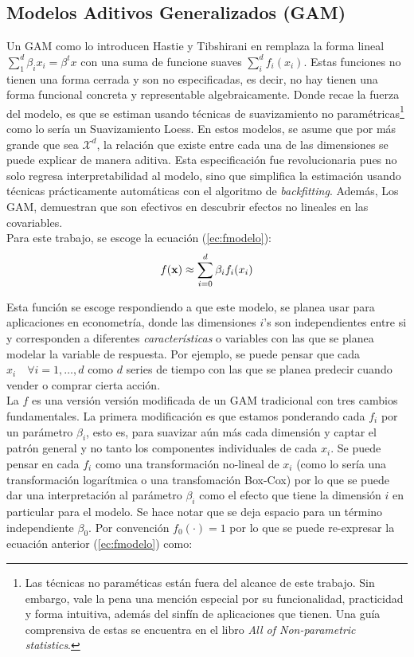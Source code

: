\documentclass[../Main/Main.tex]{subfiles}
\begin{document}
\subsection{Modelos Aditivos Generalizados (GAM)} \label{sec:GAM}
Un GAM como lo introducen Hastie y Tibshirani en \autocite{hastie1986generalized} remplaza la forma lineal $\sum_{1}^d\beta_ix_i = \beta^tx$ con una suma de funcione suaves $\sum_i^d f_i(x_i)$. Estas funciones no tienen una forma cerrada y son no especificadas, es decir, no hay tienen una forma funcional concreta y representable algebraicamente. Donde recae la fuerza del modelo, es que se estiman usando técnicas de suavizamiento no paramétricas\footnote{Las técnicas no paraméticas están fuera del alcance de este trabajo. Sin embargo, vale la pena una mención especial por su funcionalidad, practicidad y forma intuitiva, además del sinfín de aplicaciones que tienen. Una guía comprensiva de estas se encuentra en el libro \textit{All of Non-parametric statistics}\autocite{wasserman2007all}.} como lo sería un Suavizamiento Loess. En estos modelos, se asume que por más grande que sea $\mathcal{X}^d$, la relación que existe entre cada una de las dimensiones se puede explicar de manera aditiva. Esta especificación fue revolucionaria pues no solo regresa interpretabilidad al modelo, sino que simplifica la estimación usando técnicas prácticamente automáticas con el algoritmo de \textit{backfitting}. Además, Los GAM, demuestran que son efectivos en descubrir efectos no lineales en las covariables. \\

Para este trabajo, se escoge la ecuación (\ref{ec:fmodelo}): 
\begin{align*}
	f(\mathbf{x}) \approx \sum_{i=0}^d \beta_i f_i(x_i) 
\end{align*}

Esta función se escoge respondiendo a que este modelo, se planea usar para aplicaciones en econometría, donde las dimensiones $i$'s son independientes entre si y corresponden a diferentes \textit{características} o variables con las que se planea modelar la variable de respuesta. Por ejemplo, se puede pensar que cada $x_i \quad \forall i=1,\ldots,d$ como $d$ series de tiempo con las que se planea predecir cuando vender o comprar cierta acción.\\

La $f$ es una versión versión modificada de un GAM tradicional con tres cambios fundamentales. La primera modificación es que estamos ponderando cada $f_i$ por un parámetro $\beta_i$, esto es, para suavizar aún más cada dimensión y captar el patrón general y no tanto los componentes individuales de cada $x_i$. Se puede pensar en cada $f_i$ como una transformación no-lineal de $x_i$ (como lo sería una transformación logarítmica o una transfomación Box-Cox) por lo que se puede dar una interpretación al parámetro $\beta_i$ como el efecto que tiene la dimensión $i$ en particular para el modelo. Se hace notar que se deja espacio para un término independiente $\beta_0$. Por convención $f_0(\cdot) = 1$ por lo que se puede re-expresar la ecuación anterior (\ref{ec:fmodelo}) como:
\end{document}

